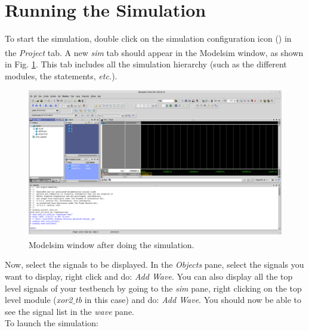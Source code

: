 \section{Running the Simulation}

To start the simulation, double click on the simulation configuration icon () in the \textit{Project} tab. A new \textit{sim} tab should appear in the Modelsim\textsuperscript{\tiny\textregistered} window, as shown in Fig. \ref{sim_modelsim_window}. This tab includes all the simulation hierarchy (such as the different modules, the statements, \textit{etc.}). 

\begin{figure}[!h]
	\centering
	\includegraphics[scale=0.28]{figures/modelsim/post_sim}
	\caption{Modelsim\textsuperscript{\tiny\textregistered} window after doing the simulation. }
	\label{sim_modelsim_window}
\end{figure}

Now, select the signals to be displayed. In the \textit{Objects} pane, select the signals you want to display, right click and do: \textit{Add Wave}. You can also display all the top level signals of your testbench by going to the \textit{sim} pane, right clicking on the top level module (\textit{xor2$\_$tb} in this case) and do: \textit{Add Wave}. You should now be able to see the signal list in the \textit{wave} pane. \\
To launch the simulation:

